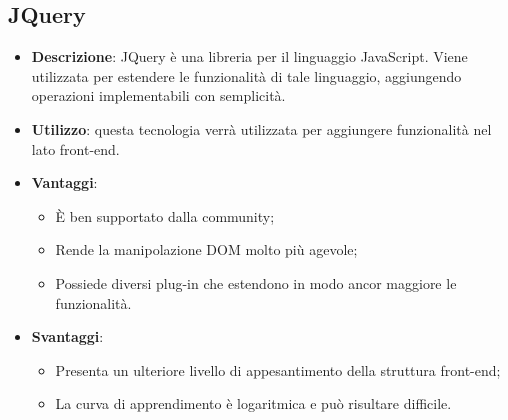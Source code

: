 \subsection{JQuery}
\begin{itemize}
	\item \textbf{Descrizione}: JQuery è una libreria per il linguaggio JavaScript. Viene utilizzata per estendere le funzionalità di tale linguaggio, aggiungendo operazioni implementabili con semplicità.
	\item \textbf{Utilizzo}: questa tecnologia verrà utilizzata per aggiungere funzionalità nel lato front-end.
	\item \textbf{Vantaggi}:
	\begin{itemize}
		\item \MakeUppercase{è} ben supportato dalla community;
		\item Rende la manipolazione DOM molto più agevole;
		\item Possiede diversi plug-in che estendono in modo ancor maggiore le funzionalità.
	\end{itemize}
	\item \textbf{Svantaggi}:
	\begin{itemize}
		\item Presenta un ulteriore livello di appesantimento della struttura front-end;
		\item La curva di apprendimento è logaritmica e può risultare difficile.
	\end{itemize}
\end{itemize}

